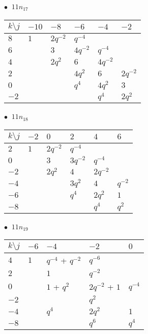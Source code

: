 %
\begin{minipage}{\linewidth}
$\bullet\ $ $11n_{17}$ \vspace{0.5em} \\
\begin{tabular}{l|lllll}
$k \setminus j$ & $-10$ & $-8$ & $-6$ & $-4$ & $-2$ \\
\hline
$8$ & $1$ & $2q^{-2}$ & $q^{-4}$ &  &  \\
$6$ &  & $3$ & $4q^{-2}$ & $q^{-4}$ &  \\
$4$ &  & $2q^{2}$ & $6$ & $4q^{-2}$ &  \\
$2$ &  &  & $4q^{2}$ & $6$ & $2q^{-2}$ \\
$0$ &  &  & $q^{4}$ & $4q^{2}$ & $3$ \\
$-2$ &  &  &  & $q^{4}$ & $2q^{2}$ \\
\end{tabular}
\vspace{2em}
\end{minipage}
%
\begin{minipage}{\linewidth}
$\bullet\ $ $11n_{18}$ \vspace{0.5em} \\
\begin{tabular}{l|lllll}
$k \setminus j$ & $-2$ & $0$ & $2$ & $4$ & $6$ \\
\hline
$2$ & $1$ & $2q^{-2}$ & $q^{-4}$ &  &  \\
$0$ &  & $3$ & $3q^{-2}$ & $q^{-4}$ &  \\
$-2$ &  & $2q^{2}$ & $4$ & $2q^{-2}$ &  \\
$-4$ &  &  & $3q^{2}$ & $4$ & $q^{-2}$ \\
$-6$ &  &  & $q^{4}$ & $2q^{2}$ & $1$ \\
$-8$ &  &  &  & $q^{4}$ & $q^{2}$ \\
\end{tabular}
\vspace{2em}
\end{minipage}
%
\begin{minipage}{\linewidth}
$\bullet\ $ $11n_{19}$ \vspace{0.5em} \\
\begin{tabular}{l|llll}
$k \setminus j$ & $-6$ & $-4$ & $-2$ & $0$ \\
\hline
$4$ & $1$ & $q^{-4}$ + $q^{-2}$ & $q^{-6}$ &  \\
$2$ &  & $1$ & $q^{-2}$ &  \\
$0$ &  & $1$ + $q^{2}$ & $2q^{-2}$ + $1$ & $q^{-4}$ \\
$-2$ &  &  & $q^{2}$ &  \\
$-4$ &  & $q^{4}$ & $2q^{2}$ & $1$ \\
$-8$ &  &  & $q^{6}$ & $q^{4}$ \\
\end{tabular}
\vspace{2em}
\end{minipage}
